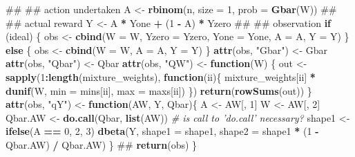 \documentclass[]{article}
\newenvironment{Shaded}{\begin{snugshade}}{\end{snugshade}}
\newcommand{\CommentTok}[1]{\textcolor[rgb]{0.56,0.35,0.01}{\textit{#1}}}
\newcommand{\ControlFlowTok}[1]{\textcolor[rgb]{0.13,0.29,0.53}{\textbf{#1}}}
\newcommand{\DataTypeTok}[1]{\textcolor[rgb]{0.13,0.29,0.53}{#1}}
\newcommand{\DecValTok}[1]{\textcolor[rgb]{0.00,0.00,0.81}{#1}}
\newcommand{\KeywordTok}[1]{\textcolor[rgb]{0.13,0.29,0.53}{\textbf{#1}}}
\newcommand{\NormalTok}[1]{#1}
\newcommand{\OperatorTok}[1]{\textcolor[rgb]{0.81,0.36,0.00}{\textbf{#1}}}
\newcommand{\StringTok}[1]{\textcolor[rgb]{0.31,0.60,0.02}{#1}}
\theoremstyle{definition}
\theoremstyle{definition}
\theoremstyle{definition}
\theoremstyle{remark}
\begin{document}
\begin{Shaded}
\begin{Highlighting}[]
\NormalTok{  ## ## action undertaken}
\NormalTok{  A <-}\StringTok{ }\KeywordTok{rbinom}\NormalTok{(n, }\DataTypeTok{size =} \DecValTok{1}\NormalTok{, }\DataTypeTok{prob =} \KeywordTok{Gbar}\NormalTok{(W))}
\NormalTok{  ## ## actual reward}
\NormalTok{  Y <-}\StringTok{ }\NormalTok{A }\OperatorTok{*}\StringTok{ }\NormalTok{Yone }\OperatorTok{+}\StringTok{ }\NormalTok{(}\DecValTok{1} \OperatorTok{-}\StringTok{ }\NormalTok{A) }\OperatorTok{*}\StringTok{ }\NormalTok{Yzero}
\NormalTok{  ## ## observation}
  \ControlFlowTok{if}\NormalTok{ (ideal) \{}
\NormalTok{    obs <-}\StringTok{ }\KeywordTok{cbind}\NormalTok{(}\DataTypeTok{W =}\NormalTok{ W, }\DataTypeTok{Yzero =}\NormalTok{ Yzero, }\DataTypeTok{Yone =}\NormalTok{ Yone, }\DataTypeTok{A =}\NormalTok{ A, }\DataTypeTok{Y =}\NormalTok{ Y)}
\NormalTok{  \} }\ControlFlowTok{else}\NormalTok{ \{}
\NormalTok{    obs <-}\StringTok{ }\KeywordTok{cbind}\NormalTok{(}\DataTypeTok{W =}\NormalTok{ W, }\DataTypeTok{A =}\NormalTok{ A, }\DataTypeTok{Y =}\NormalTok{ Y)}
\NormalTok{  \}}
  \KeywordTok{attr}\NormalTok{(obs, }\StringTok{"Gbar"}\NormalTok{) <-}\StringTok{ }\NormalTok{Gbar}
  \KeywordTok{attr}\NormalTok{(obs, }\StringTok{"Qbar"}\NormalTok{) <-}\StringTok{ }\NormalTok{Qbar}
  \KeywordTok{attr}\NormalTok{(obs, }\StringTok{"QW"}\NormalTok{) <-}\StringTok{ }\ControlFlowTok{function}\NormalTok{(W) \{}
\NormalTok{    out <-}\StringTok{ }\KeywordTok{sapply}\NormalTok{(}\DecValTok{1}\OperatorTok{:}\KeywordTok{length}\NormalTok{(mixture_weights),}
                  \ControlFlowTok{function}\NormalTok{(ii)\{}
\NormalTok{                    mixture_weights[ii] }\OperatorTok{*}
\StringTok{                      }\KeywordTok{dunif}\NormalTok{(W, }\DataTypeTok{min =}\NormalTok{ mins[ii], }\DataTypeTok{max =}\NormalTok{ maxs[ii])}
\NormalTok{                  \})}
    \KeywordTok{return}\NormalTok{(}\KeywordTok{rowSums}\NormalTok{(out))}
\NormalTok{  \}}
  \KeywordTok{attr}\NormalTok{(obs, }\StringTok{"qY"}\NormalTok{) <-}\StringTok{ }\ControlFlowTok{function}\NormalTok{(AW, Y, Qbar)\{}
\NormalTok{    A <-}\StringTok{ }\NormalTok{AW[, }\DecValTok{1}\NormalTok{]}
\NormalTok{    W <-}\StringTok{ }\NormalTok{AW[, }\DecValTok{2}\NormalTok{]}
\NormalTok{    Qbar.AW <-}\StringTok{ }\KeywordTok{do.call}\NormalTok{(Qbar, }\KeywordTok{list}\NormalTok{(AW)) }\CommentTok{# is call to 'do.call' necessary?}
\NormalTok{    shape1 <-}\StringTok{ }\KeywordTok{ifelse}\NormalTok{(A }\OperatorTok{==}\StringTok{ }\DecValTok{0}\NormalTok{, }\DecValTok{2}\NormalTok{, }\DecValTok{3}\NormalTok{)}
    \KeywordTok{dbeta}\NormalTok{(Y, }\DataTypeTok{shape1 =}\NormalTok{ shape1, }\DataTypeTok{shape2 =}\NormalTok{ shape1 }\OperatorTok{*}\StringTok{ }\NormalTok{(}\DecValTok{1} \OperatorTok{-}\StringTok{ }\NormalTok{Qbar.AW) }\OperatorTok{/}\StringTok{ }\NormalTok{Qbar.AW)}
\NormalTok{  \}}
\NormalTok{  ##}
  \KeywordTok{return}\NormalTok{(obs)}
\NormalTok{\}}
\end{Highlighting}
\end{Shaded}
\end{document}
